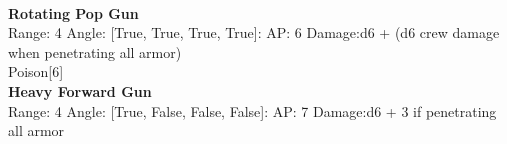 \ \\
{\bf Rotating Pop Gun } \\



Range: 4  Angle: [True, True, True, True]: AP: 6 Damage:d6 + (d6 crew damage when penetrating all armor) \\
Poison[6]\\ 




{\bf Heavy Forward Gun } \\



Range: 4  Angle: [True, False, False, False]: AP: 7 Damage:d6 + 3 if penetrating all armor \\




 
\ \\



